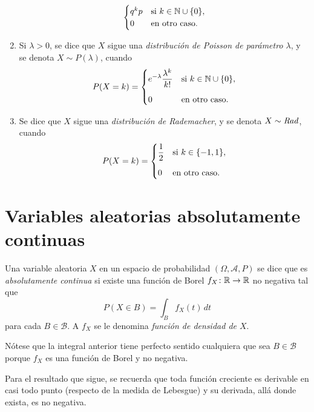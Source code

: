 \documentclass[a4paper, 11pt, extrafontsizes]{memoir}
\begin{document}
\begin{definition}
\begin{enumerate}
\[            \begin{cases}
            q^kp & $si$ \ k \in \N \cup \{0\}, \\
            0 & $en otro caso$.
            \end{cases}
        \]
        \item Si $\lambda > 0$, se dice que $X$ sigue una \emph{{distribución de Poisson de parámetro ${\lambda}$}}, y se denota $X \sim P(\lambda)$, cuando
        \[P(X=k) =
            \begin{cases}
            \displaystyle e^{-\lambda}\frac{\lambda^k}{k!} & $si$ \ k \in \N \cup \{0\}, \\[10pt]
            0 & $en otro caso$.
            \end{cases}
        \]
        \item Se dice que $X$ sigue una \emph{distribución de Rademacher}, y se denota $X \sim \textup{\emph{Rad}}$, cuando
        \[P(X=k) =
            \begin{cases}
            \displaystyle \frac{1}{2} & $si$ \ k \in \{-1,1\}, \\[10pt]
            0 & $en otro caso$.
            \end{cases}
        \]
    \end{enumerate}
\end{definition}

\section{Variables aleatorias absolutamente continuas}

\begin{definition}
    Una variable aleatoria $X$ en un espacio de probabilidad $(\Omega,\mathcal{A},P)$ se dice que es \emph{absolutamente continua} si existe una función de Borel $f_X \colon \mathbb R \to \mathbb R$ no negativa tal que
    \[P(X \in B) = \int_B f_X(t) \, dt\]
    para cada $B \in \mathcal{B}$. A $f_X$ se le denomina \emph{función de densidad de $X$}.
\end{definition}

Nótese que la integral anterior tiene perfecto sentido cualquiera que sea $B \in \mathcal{B}$ porque $f_X$ es una función de Borel y no negativa.

Para el resultado que sigue, se recuerda que toda función creciente es derivable en casi todo punto (respecto de la medida de Lebesgue) y su derivada, allá donde exista, es no negativa.
\end{document}
